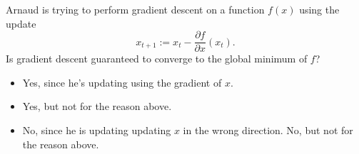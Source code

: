 \documentclass[11pt, a4paper]{article}
\begin{document}
Arnaud is trying to perform gradient descent on a function $f(x)$ using the update $$x_{t+1} := x_t - \frac{\partial f}{\partial x}(x_t).$$ Is gradient descent guaranteed to converge to the global minimum of $f$?
\begin{itemize}
    \item Yes, since he's updating using the gradient of $x$.
    \item Yes, but not for the reason above.
    \item No, since he is updating updating $x$ in the wrong direction.
    \solitem No, but not for the reason above. %
\end{itemize}
\end{document}
